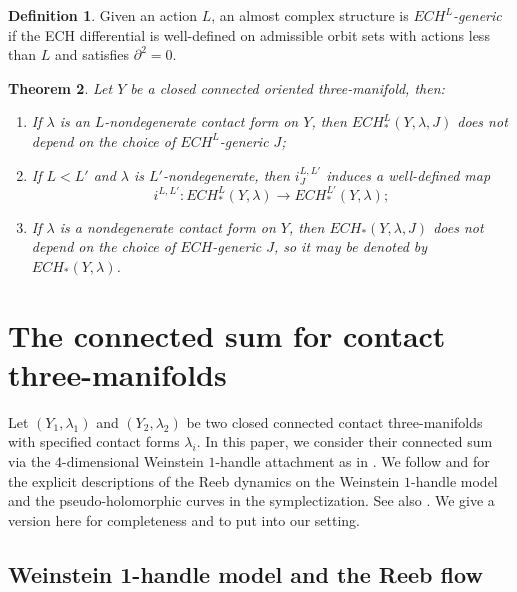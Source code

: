 \documentclass{article}
\numberwithin{equation}{section}
\newtheorem{theorem}{Theorem}[section]
\theoremstyle{definition}
\newtheorem{definition}[theorem]{Definition}
\begin{document}
\begin{definition}
Given an action $L$, an almost complex structure is \emph{$ECH^L$-generic} if the ECH differential is well-defined on admissible orbit sets with actions less than $L$ and satisfies $\partial^2 = 0$.
\end{definition}

\begin{theorem}\cite[Theorem 1.3]{HT_Chord_II}
\label{thm:filtered_ech}
    Let $Y$ be a closed connected oriented three-manifold, then: 
    \begin{enumerate}
        \item If $\lambda$ is an $L$-nondegenerate contact form on $Y$, then $ECH_*^L(Y,\lambda, J)$ does not depend on the choice of $ECH^L$-generic $J$;
        \item If $L<L'$ and $\lambda$ is $L'$-nondegenerate, then $i_J^{L,L'}$ induces a well-defined map
        $$i^{L,L'}:ECH_*^L(Y, \lambda) \longrightarrow ECH_*^{L'}(Y,\lambda);$$
        \item If $\lambda$ is a nondegenerate contact form on $Y$, then $ECH_*(Y,\lambda, J)$ does not depend on the choice of $ECH$-generic $J$, so it may be denoted by $ECH_*(Y,\lambda)$.
    \end{enumerate}
\end{theorem}




\section{The connected sum for contact three-manifolds}
\label{sec:connected_sum}
Let $(Y_1, \lambda_1)$ and $(Y_2, \lambda_2)$ be two closed connected contact three-manifolds with specified contact forms $\lambda_i$. In this paper, we consider their connected sum via the $4$-dimensional Weinstein $1$-handle attachment as in \cite{Weinstein_one_handle}. We follow \cite{Weinstein_one_handle} and \cite{Fish_Siefring} for the explicit descriptions of the Reeb dynamics on the Weinstein $1$-handle model and the pseudo-holomorphic curves in the symplectization. See also \cite{232, BVK}. We give a version here for completeness and to put into our setting.


\subsection{Weinstein 1-handle model and the Reeb flow}
\label{sec:weinstein}
\end{document}
